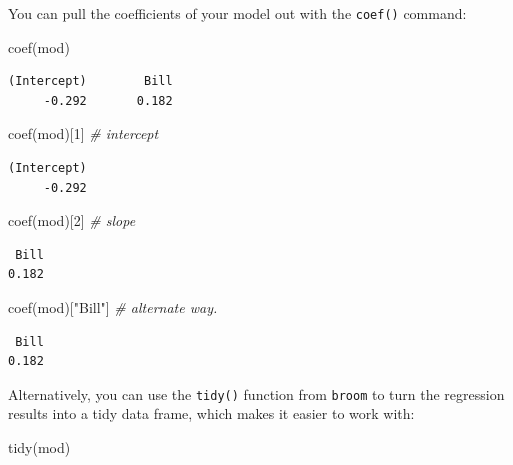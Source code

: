 \documentclass[
  letterpaper,
  DIV=11,
  numbers=noendperiod]{scrreprt}
\newenvironment{Shaded}{\begin{snugshade}}{\end{snugshade}}
\newcommand{\CommentTok}[1]{\textcolor[rgb]{0.38,0.63,0.69}{\textit{#1}}}
\newcommand{\DecValTok}[1]{\textcolor[rgb]{0.25,0.63,0.44}{#1}}
\newcommand{\FunctionTok}[1]{\textcolor[rgb]{0.02,0.16,0.49}{#1}}
\newcommand{\NormalTok}[1]{\textcolor[rgb]{0.00,0.44,0.13}{#1}}
\newcommand{\StringTok}[1]{\textcolor[rgb]{0.25,0.44,0.63}{#1}}
\begin{document}
You can pull the coefficients of your model out with the \texttt{coef()}
command:

\begin{Shaded}
\begin{Highlighting}[]
\FunctionTok{coef}\NormalTok{(mod)}
\end{Highlighting}
\end{Shaded}

\begin{verbatim}
(Intercept)        Bill 
     -0.292       0.182 
\end{verbatim}

\begin{Shaded}
\begin{Highlighting}[]
\FunctionTok{coef}\NormalTok{(mod)[}\DecValTok{1}\NormalTok{] }\CommentTok{\# intercept}
\end{Highlighting}
\end{Shaded}

\begin{verbatim}
(Intercept) 
     -0.292 
\end{verbatim}

\begin{Shaded}
\begin{Highlighting}[]
\FunctionTok{coef}\NormalTok{(mod)[}\DecValTok{2}\NormalTok{] }\CommentTok{\# slope}
\end{Highlighting}
\end{Shaded}

\begin{verbatim}
 Bill 
0.182 
\end{verbatim}

\begin{Shaded}
\begin{Highlighting}[]
\FunctionTok{coef}\NormalTok{(mod)[}\StringTok{"Bill"}\NormalTok{] }\CommentTok{\# alternate way.}
\end{Highlighting}
\end{Shaded}

\begin{verbatim}
 Bill 
0.182 
\end{verbatim}

Alternatively, you can use the \texttt{tidy()} function from
\texttt{broom} to turn the regression results into a tidy data frame,
which makes it easier to work with:

\begin{Shaded}
\begin{Highlighting}[]
\FunctionTok{tidy}\NormalTok{(mod)}
\end{Highlighting}
\end{Shaded}
\end{document}
